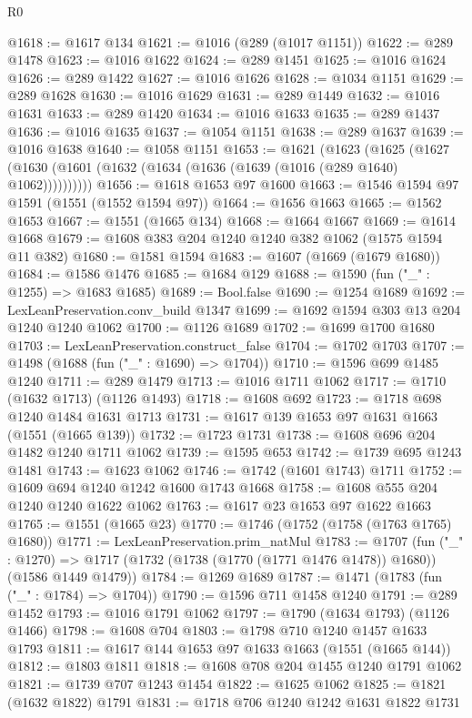 \begin{lexlean}{R0}
\begin{coremodule}
@1618 := @1617 @134
@1621 := @1016 (@289 (@1017 @1151))
@1622 := @289 @1478
@1623 := @1016 @1622
@1624 := @289 @1451
@1625 := @1016 @1624
@1626 := @289 @1422
@1627 := @1016 @1626
@1628 := @1034 @1151
@1629 := @289 @1628
@1630 := @1016 @1629
@1631 := @289 @1449
@1632 := @1016 @1631
@1633 := @289 @1420
@1634 := @1016 @1633
@1635 := @289 @1437
@1636 := @1016 @1635
@1637 := @1054 @1151
@1638 := @289 @1637
@1639 := @1016 @1638
@1640 := @1058 @1151
@1653 := @1621
    (@1623
      (@1625 (@1627 (@1630 (@1601 (@1632 (@1634 (@1636 (@1639 (@1016 (@289 @1640) @1062))))))))))
@1656 := @1618 @1653 @97 @1600
@1663 := @1546 @1594 @97 @1591 (@1551 (@1552 @1594 @97))
@1664 := @1656 @1663
@1665 := @1562 @1653
@1667 := @1551 (@1665 @134)
@1668 := @1664 @1667
@1669 := @1614 @1668
@1679 := @1608 @383 @204 @1240 @1240 @382 @1062 (@1575 @1594 @11 @382)
@1680 := @1581 @1594
@1683 := @1607 (@1669 (@1679 @1680))
@1684 := @1586 @1476
@1685 := @1684 @129
@1688 := @1590 (fun ("_" : @1255) => @1683 @1685)
@1689 := Bool.false
@1690 := @1254 @1689
@1692 := LexLeanPreservation.conv_build @1347
@1699 := @1692 @1594 @303 @13 @204 @1240 @1240 @1062
@1700 := @1126 @1689
@1702 := @1699 @1700 @1680
@1703 := LexLeanPreservation.construct_false
@1704 := @1702 @1703
@1707 := @1498 (@1688 (fun ("_" : @1690) => @1704))
@1710 := @1596 @699 @1485 @1240
@1711 := @289 @1479
@1713 := @1016 @1711 @1062
@1717 := @1710 (@1632 @1713) (@1126 @1493)
@1718 := @1608 @692
@1723 := @1718 @698 @1240 @1484 @1631 @1713
@1731 := @1617 @139 @1653 @97 @1631 @1663 (@1551 (@1665 @139))
@1732 := @1723 @1731
@1738 := @1608 @696 @204 @1482 @1240 @1711 @1062
@1739 := @1595 @653
@1742 := @1739 @695 @1243 @1481
@1743 := @1623 @1062
@1746 := @1742 (@1601 @1743) @1711
@1752 := @1609 @694 @1240 @1242 @1600 @1743 @1668
@1758 := @1608 @555 @204 @1240 @1240 @1622 @1062
@1763 := @1617 @23 @1653 @97 @1622 @1663
@1765 := @1551 (@1665 @23)
@1770 := @1746 (@1752 (@1758 (@1763 @1765) @1680))
@1771 := LexLeanPreservation.prim_natMul
@1783 := @1707
    (fun ("_" : @1270) =>
    @1717 (@1732 (@1738 (@1770 (@1771 @1476 @1478)) @1680)) (@1586 @1449 @1479))
@1784 := @1269 @1689
@1787 := @1471 (@1783 (fun ("_" : @1784) => @1704))
@1790 := @1596 @711 @1458 @1240
@1791 := @289 @1452
@1793 := @1016 @1791 @1062
@1797 := @1790 (@1634 @1793) (@1126 @1466)
@1798 := @1608 @704
@1803 := @1798 @710 @1240 @1457 @1633 @1793
@1811 := @1617 @144 @1653 @97 @1633 @1663 (@1551 (@1665 @144))
@1812 := @1803 @1811
@1818 := @1608 @708 @204 @1455 @1240 @1791 @1062
@1821 := @1739 @707 @1243 @1454
@1822 := @1625 @1062
@1825 := @1821 (@1632 @1822) @1791
@1831 := @1718 @706 @1240 @1242 @1631 @1822 @1731

\end{coremodule}
\end{lexlean}
